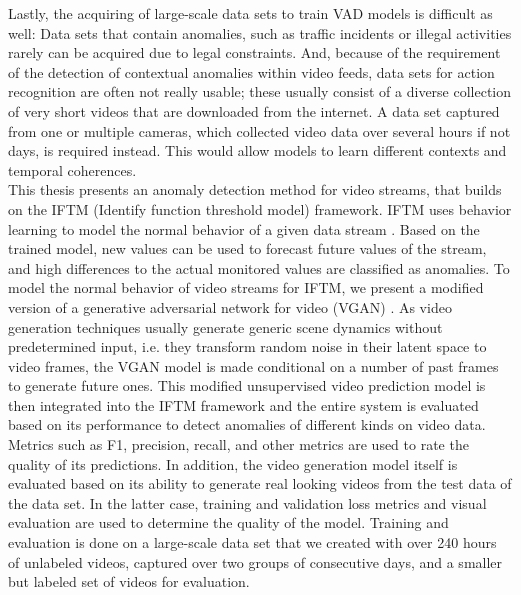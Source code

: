Lastly, the acquiring of large-scale data sets to train VAD models is difficult as well: Data sets that contain anomalies, such as traffic incidents or illegal activities rarely can be acquired due to legal constraints. And, because of the requirement of the detection of contextual anomalies within video feeds, data sets for action recognition are often not really usable; these usually consist of a diverse collection of very short videos that are downloaded from the internet. A data set captured from one or multiple cameras, which collected video data over several hours if not days, is required instead. This would allow models to learn different contexts and temporal coherences.\\

This thesis presents an anomaly detection method for video streams, that builds on the IFTM (Identify function threshold model) framework. IFTM uses behavior learning to model the normal behavior of a given data stream \cite{schmidt2018iftm}. Based on the trained model, new values can be used to forecast future values of the stream, and high differences to the actual monitored values are classified as anomalies. To model the normal behavior of video streams for IFTM, we present a modified version of a generative adversarial network for video (VGAN) \cite{vondrick2017generating}. As video generation techniques usually generate generic scene dynamics without predetermined input, i.e. they transform random noise in their latent space to video frames, the VGAN model is made conditional on a number of past frames to generate future ones. This modified unsupervised video prediction model is then integrated into the IFTM framework and the entire system is evaluated based on its performance to detect anomalies of different kinds on video data. Metrics such as F1, precision, recall, and other metrics are used to rate the quality of its predictions. In addition, the video generation model itself is evaluated based on its ability to generate real looking videos from the test data of the data set. In the latter case, training and validation loss metrics and visual evaluation are used to determine the quality of the model. Training and evaluation is done on a large-scale data set that we created with over 240 hours of unlabeled videos, captured over two groups of consecutive days, and a smaller but labeled set of videos for evaluation.\\


